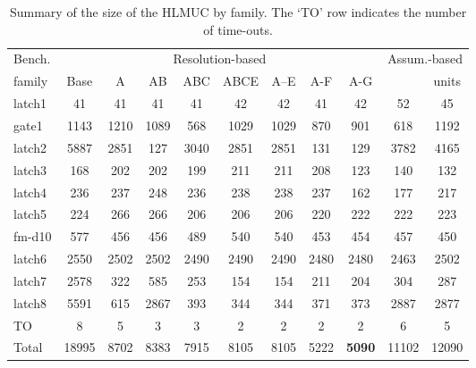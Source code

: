 \documentclass[twoside,11pt]{article}
\begin{document}
\begin{table}
\begin{center}
\caption{Summary of the size of the HLMUC by family. The `TO'
row indicates the number of time-outs.}\label{ta:2}
\begin{tabular}{|l|c|c|c|c|c|c|c|c|c|c|}\hline
Bench.	& \multicolumn{8}{c|}{Resolution-based}	&        \multicolumn{2}{c|}{Assum.-based} \\ \cline{2-11}
family	&  Base		&    A		&  AB    		&  ABC   		&  ABCE  		& A--E	& A-F	& A-G	 &  &  units	 \\ \hline
latch1      &  41		&  41		&  41		&  41		&  42		&  42		&  41		& 42	&  52		&   45	\\
gate1	    &  1143		&  1210		&  1089		&  568		&  1029		&  1029		&  870		& 901	&  618		&   1192	\\
latch2    	&  5887		&  2851		&  127		&  3040		&  2851		&  2851		&  131		& 129	&  3782		&   4165	\\
latch3      &  168		&  202		&  202		&  199		&  211		&  211		&  208		& 123	&  140		&   132	\\
latch4 		&  236		&  237		&  248		&  236		&  238		&  238		&  237		& 162	&  177		&   217	 \\
latch5 		&  224		&  266		&  266		&  206		&  206		&  206		&  220		& 222	&  222		&   223	 \\
fm-d10	&  577		&  456		&  456		&  489		&  540		&  540		&  453		& 454	&  457		&   450	 \\
latch6      &  2550		&  2502		&  2502		&  2490		&  2490		&  2490		&  2480		& 2480	&  2463		&   2502	\\
latch7	    &  2578		&  322		&  585		&  253		&  154		&  154		&  211		& 204	&  304		&   287	\\
latch8      &  5591		&  615		&  2867		&  393		&  344		&  344		&  371		& 373	&  2887		&   2877	\\ \hline
TO          & 8         & 5	        & 3	        & 3         & 2         & 2         & 2         & 2     & 6         & 5 \\ \hline
Total	    &  18995	&  8702		&  8383		&  7915		&  8105		&  8105		&  5222		& {\bf 5090}& 11102 &   12090	\\ \hline

\end{tabular}
\end{center}
\end{table}
\end{document}
